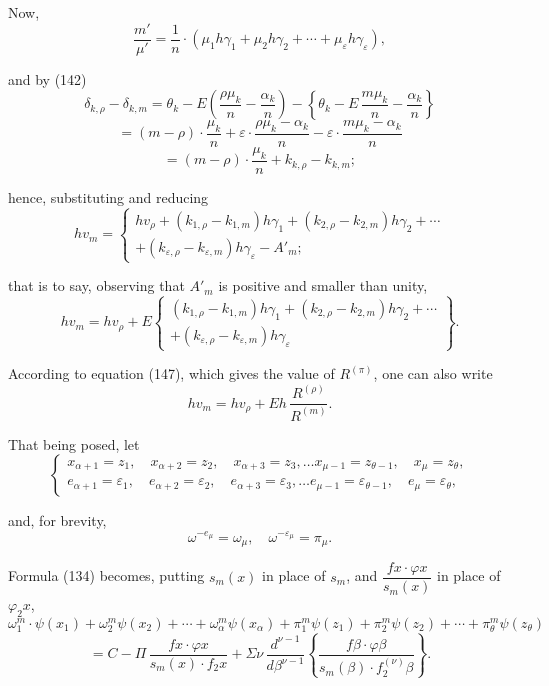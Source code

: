 \documentclass{article}
\begin{document}
Now,
\[ \frac{m'}{\mu'} = \frac{1}{n} \cdot (\mu_1 h\gamma_1+\mu_2 h\gamma_2+\cdots+\mu_\varepsilon h\gamma_\varepsilon), \]

and by (142)
\[ \delta_{k,\rho} - \delta_{k,m} = \theta_k - E\left(\frac{\rho\mu_k}{n}-\frac{\alpha_k}{n}\right) - \left\{\theta_k - E\,\frac{m\mu_k}{n}-\frac{\alpha_k}{n}\right\} \]
\[ = (m-\rho) \cdot \frac{\mu_k}{n} + \varepsilon \cdot \frac{\rho\mu_k-\alpha_k}{n} - \varepsilon \cdot \frac{m\mu_k-\alpha_k}{n} \]
\[ = (m-\rho) \cdot \frac{\mu_k}{n} + k_{k,\rho} - k_{k,m}; \]

hence, substituting and reducing
\[ hv_m = \begin{cases}
hv_\rho + (k_{1,\rho}-k_{1,m})h\gamma_1 + (k_{2,\rho}-k_{2,m})h\gamma_2 + \cdots \\
+ (k_{\varepsilon,\rho}-k_{\varepsilon,m})h\gamma_\varepsilon - A'_m;
\end{cases} \]

that is to say, observing that $A'_m$ is positive and smaller than unity,
\[ hv_m = hv_\rho + E \begin{Bmatrix} (k_{1,\rho}-k_{1,m})h\gamma_1+(k_{2,\rho}-k_{2,m})h\gamma_2+\cdots \\ +(k_{\varepsilon,\rho}-k_{\varepsilon,m})h\gamma_\varepsilon \end{Bmatrix}. \tag{175} \]

According to equation (147), which gives the value of $R^{(\pi)}$, one can also write
\[ hv_m = hv_\rho + Eh\,\frac{R^{(\rho)}}{R^{(m)}}. \tag{176} \]

That being posed, let
\[ \begin{cases} x_{\alpha+1} = z_1, \quad x_{\alpha+2} = z_2, \quad x_{\alpha+3} = z_3, \ldots x_{\mu-1} = z_{\theta-1}, \quad x_\mu = z_\theta, \\ e_{\alpha+1} = \varepsilon_1, \quad e_{\alpha+2} = \varepsilon_2, \quad e_{\alpha+3} = \varepsilon_3, \ldots e_{\mu-1} = \varepsilon_{\theta-1}, \quad e_\mu = \varepsilon_\theta, \end{cases} \tag{177} \]

and, for brevity,
\[ \omega^{-e_\mu} = \omega_\mu, \quad \omega^{-\varepsilon_\mu} = \pi_\mu. \tag{178} \]

Formula (134) becomes, putting $s_m(x)$ in place of $s_m$, and $\dfrac{f x \cdot \varphi x}{s_m(x)}$ in place of $\varphi_2 x$,
\[ \omega_1^{m} \cdot \psi(x_1)+\omega_2^{m}\psi(x_2)+\cdots+\omega_\alpha^{m}\psi(x_\alpha)+\pi_1^{m}\psi(z_1)+\pi_2^{m}\psi(z_2)+\cdots+\pi_\theta^{m}\psi(z_\theta) \]
\[ = C - \Pi\,\frac{f x \cdot \varphi x}{s_m(x) \cdot f_2 x} + \Sigma\nu\,\frac{d^{\nu-1}}{d\beta^{\nu-1}} \left\{ \frac{f\beta \cdot \varphi\beta}{s_m(\beta) \cdot f_2^{(\nu)}\beta} \right\}. \tag{179} \]
\end{document}
